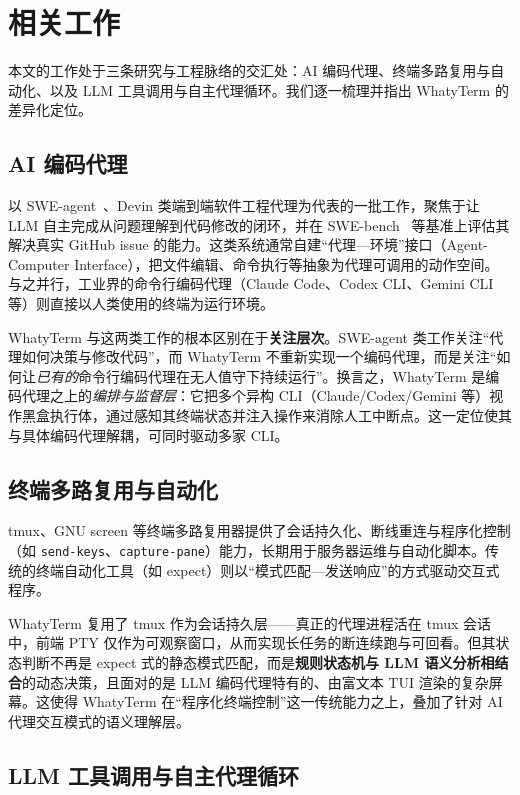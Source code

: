 \section{相关工作}
\label{sec:related}

本文的工作处于三条研究与工程脉络的交汇处：AI 编码代理、终端多路复用与自动化、以及 LLM 工具调用与自主代理循环。我们逐一梳理并指出 WhatyTerm 的差异化定位。

\subsection{AI 编码代理}

以 SWE-agent~\cite{yang2024sweagent}、Devin 类端到端软件工程代理为代表的一批工作，聚焦于让 LLM 自主完成从问题理解到代码修改的闭环，并在 SWE-bench~\cite{jimenez2024swebench} 等基准上评估其解决真实 GitHub issue 的能力。这类系统通常自建“代理—环境”接口（Agent-Computer Interface），把文件编辑、命令执行等抽象为代理可调用的动作空间。与之并行，工业界的命令行编码代理（Claude Code、Codex CLI、Gemini CLI 等）则直接以人类使用的终端为运行环境。

WhatyTerm 与这两类工作的根本区别在于\textbf{关注层次}。SWE-agent 类工作关注“代理如何决策与修改代码”，而 WhatyTerm 不重新实现一个编码代理，而是关注“如何让\emph{已有的}命令行编码代理在无人值守下持续运行”。换言之，WhatyTerm 是编码代理之上的\emph{编排与监督层}：它把多个异构 CLI（Claude/Codex/Gemini 等）视作黑盒执行体，通过感知其终端状态并注入操作来消除人工中断点。这一定位使其与具体编码代理解耦，可同时驱动多家 CLI。

\subsection{终端多路复用与自动化}

tmux、GNU screen 等终端多路复用器提供了会话持久化、断线重连与程序化控制（如 \texttt{send-keys}、\texttt{capture-pane}）能力，长期用于服务器运维与自动化脚本。传统的终端自动化工具（如 expect）则以“模式匹配—发送响应”的方式驱动交互式程序。

WhatyTerm 复用了 tmux 作为会话持久层——真正的代理进程活在 tmux 会话中，前端 PTY 仅作为可观察窗口，从而实现长任务的断连续跑与可回看。但其状态判断不再是 expect 式的静态模式匹配，而是\textbf{规则状态机与 LLM 语义分析相结合}的动态决策，且面对的是 LLM 编码代理特有的、由富文本 TUI 渲染的复杂屏幕。这使得 WhatyTerm 在“程序化终端控制”这一传统能力之上，叠加了针对 AI 代理交互模式的语义理解层。

\subsection{LLM 工具调用与自主代理循环}

